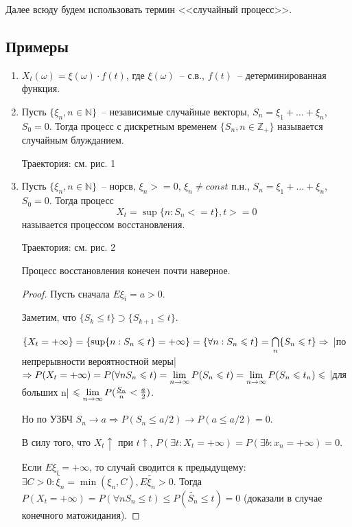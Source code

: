\begin{remark}
Далее всюду будем использовать термин <<случайный процесс>>.
\end{remark}

\subsection{Примеры}
\begin{enumerate}
\item $X_t(\omega) = \xi(\omega) \cdot f(t)$, где $\xi(\omega)$~-- с.в., $f(t)$~-- детерминированная функция.
\item Пусть $\{\xi_n, n\in\mathbb{N}\}$~-- независимые случайные векторы, $S_n = \xi_1 + \dots + \xi_n$,
$S_0 = 0$. Тогда процесс с дискретным временем $\{S_n, n \in \mathbb{Z}_+\}$
называется случайным блужданием.

Траектория: см. рис. 1
\item Пусть $\{\xi_n, n \in \mathbb{N}\}$~-- норсв, $\xi_n >= 0$, $\xi_n \neq const$ п.н.,
$S_n = \xi_1 + \dots + \xi_n$, $S_0 = 0$. Тогда процесс
$$X_t = \sup\{n: S_n <= t\}, t >= 0$$
называется процессом восстановления.

Траектория: см. рис. 2

\begin{statement}
Процесс восстановления конечен почти наверное.
\end{statement}
\begin{proof}
Пусть сначала $E\xi_i = a > 0$.

Заметим, что $\{S_k \leq t\} \supset \{S_{k+1} \leq t\}$.

$\{X_t=+\infty\} = \{\sup\{n:S_n\leqslant t\} = +\infty\} =
\{\forall n: S_n \leqslant t\} = \bigcap\limits_n\{S_n \leqslant t\} \Rightarrow$
|по непрерывности вероятностной меры|
$\Rightarrow P(X_t = +\infty) = P(\forall n S_n \leqslant t) =
\lim\limits_{n \to \infty} P(S_n \leqslant t)
= \lim\limits_{n \to \infty} P(S_n \leqslant t_n) \leqslant$ %
|для больших n|
$\leqslant \lim\limits_{n \to \infty} P(\frac{S_n}{n} < \frac{a}{2})$.

Но по УЗБЧ $S_n \to a \Rightarrow P(S_n \leq a/2) \to P(a \leq a/2) = 0$.

В силу того, что $X_t\uparrow$ при $t\uparrow$,
$P(\exists t: X_t = +\infty) = P(\exists b: x_n = +\infty) = 0$. %

Если $E\xi_i = +\infty$, то случай сводится к предыдущему:
$\exists C > 0: \tilde{\xi_n} = \min(\xi_n, C), E\tilde{\xi_n} > 0$.
Тогда $P(X_t = +\infty) = P(\forall n S_n \leq t) \leq P(\tilde{S_n} \leq t) = 0$
(доказали в случае конечного матожидания).
\end{proof}


\end{enumerate}
